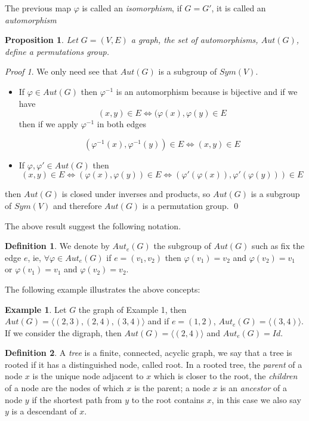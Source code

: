 \documentclass[12pt,a4paper]{book}
\theoremstyle{plain}
\newtheorem{proposition}{Proposition}
\theoremstyle{definition}
\newtheorem{definition}{Definition}
\newtheorem{example}{Example}
\theoremstyle{remark}
\newtheorem*{Proof}{Proof}
\begin{document}
The previous map $\varphi$ is called an \emph{isomorphism}, if $G=G'$, it is called an \emph{automorphism}

\begin{proposition} 
 Let $G=(V,E)$ a graph, the set of automorphisms, $Aut(G)$, define a permutations group.
\end{proposition}

\begin{Proof}
We only need see that $Aut(G)$ is a subgroup of $Sym(V)$.

\begin{itemize}
 \item  If $\varphi \in Aut(G)$ then $\varphi^{-1}$ is an automorphism because is bijective and if we have
\[
 (x,y) \in E \Leftrightarrow ( \varphi(x), \varphi(y) \in E 
\]
then if we apply $\varphi^{-1}$ in both edges

\[
 ( \varphi^{-1}(x), \varphi^{-1} (y) ) \in E \Leftrightarrow (x,y) \in E
\]
\item If $ \varphi, \varphi' \in Aut(G)$ then
\[
 (x,y) \in E \Leftrightarrow (\varphi(x), \varphi(y) ) \in E \Leftrightarrow ( \varphi' ( \varphi (x)), \varphi' ( \varphi (y))) \in E
\]

\end{itemize}
then $Aut(G)$ is closed under inverses and products, so $Aut(G)$ is a subgroup of $Sym(V)$ and therefore $Aut(G)$ is a permutation group.
\qed  \end{Proof}

The above result suggest the following notation.

\begin{definition}
We denote by $Aut_e(G)$ the subgroup of $Aut(G)$ such as fix the edge $e$, ie, $\forall \varphi \in Aut_e(G) $ if $e = (v_1, v_2)$ then 
$\varphi (v_1) = v_2$ and $\varphi(v_2) = v_1$ or $\varphi(v_1 ) = v_1$ and $\varphi (v_2) = v_2$.
\end{definition}

The following example illustrates the above concepts:
\begin{example}
 Let $G$ the graph of Example 1, then $Aut(G) = \langle (2,3), (2,4), (3,4) \rangle$ and if $e = (1,2)$, $Aut_e(G) = \langle (3,4) \rangle$.
If we consider the digraph, then $Aut(G) = \langle (2,4) \rangle$ and $Aut_e(G) = Id$. 
\end{example}

\begin{definition}
A \emph{tree} is a finite, connected, acyclic graph, we say that a tree is rooted if it has a distinguished node, called root. 
In a rooted tree, the \emph{parent} of a node $x$ is the unique node adjacent to $x$ which is closer to the root,  
the \emph{children} of a node are the nodes of which $x$ is the parent; a node $x$ is an \emph{ancestor}  of a node $y$ 
if the shortest path from $y$ to the root contains $x$, in this case we also say $y$ is a descendant of $x$. 
\end{definition}
\end{document}
